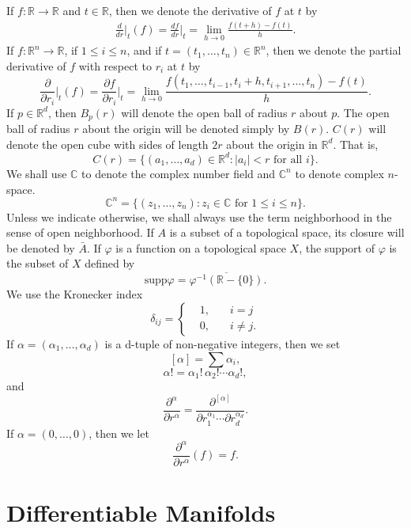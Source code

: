 If $f\colon \mathbb{R} \to \mathbb{R}$ and $t \in \mathbb{R}$, then we denote the derivative of $f$ at $t$ by
\[
	\begin{array}{r}{\frac{d}{d r}\bigg\vert_{t}(f)=\frac{d f}{d r}\bigg\vert_{t}=\lim_{h\to0}\frac{f(t+h)-f(t)}{h}.}\end{array}
\]
If $f: \mathbb{R}^n \to \mathbb{R}$, if $1 \leq i \leq n$, and if $t = (t_1, \ldots, t_n) \in \mathbb{R}^n$, then we denote the partial derivative
of $f$ with respect to $r_i$ at $t$ by 
\[
	\frac{\partial}{\partial r_{i}}\Big\vert_{t}(f)=\frac{\partial f}{\partial r_{i}}\Big\vert_{t}=\lim_{h\to0}\frac{f(t_{1},\ldots,t_{i-1},t_{i}+h,t_{i+1},\ldots,t_{n})-f(t)}{h}.
\]
If $p \in \mathbb{R}^d$, then $B_p(r)$ will denote the open ball of radius $r$ about $p$. The
open ball of radius $r$ about the origin will be denoted simply by $B(r)$. $C(r)$ will
denote the open cube with sides of length $2r$ about the origin in $\mathbb{R}^d$. That is,
\[
	C(r)=\{(a_{1},\ldots,a_{d})\in\mathbb{R}^{d}\colon|a_{i}|<r\text{ for all }i\}.
\]
We shall use $\mathbb{C}$ to denote the complex number field and $\mathbb{C}^{n}$ to denote complex
$n$-space. 
\[
	\mathbb{C}^{n}=\{(z_{1},\ldots,z_{n})\colon z_{i}\in\mathbb{C}\text{ for }1\leq i\leq n\}.
\]
Unless we indicate otherwise, we shall always use the term neighborhood in the sense of open
neighborhood. If $A$ is a subset of a topological space, its closure will be denoted by
$\bar{A}$. If $\varphi$ is a function on a topological space $X$, the support of $\varphi$ is
the subset of $X$ defined by 
\[
	\mathrm{supp}\varphi=\overline{{\varphi^{-1}(\mathbb{R}-\{0\})}}.
\]
We use the Kronecker index 
\[
	\delta_{i j}=\left\{\begin{aligned}{}&{{}1,\quad}&{i=j}\\ {}&{{}0,\quad}&{i\neq j.}\end{aligned}\right.
\]
If  $ \alpha=(\alpha_{1},\ldots,\alpha_{d}) $ is a d-tuple of non-negative integers, then we set
\[
	[\alpha]=\textstyle\sum\alpha_{i},
\]
\[
	\alpha!=\alpha_{1}!\,\alpha_{2}!\cdots\alpha_{d}!,
\]
and
\[
	\frac{\partial^{\alpha}}{\partial r^{\alpha}}=\frac{\partial^{[\alpha]}}{\partial r_{1}^{\alpha_{1}}\cdots\partial r_{d}^{\alpha_{d}}}.
\]
If  $ \alpha = (0, \ldots, 0) $, then we let
\[
	\frac{\partial^{\alpha}}{\partial r^{\alpha}}(f)=f.
\]

\section{Differentiable Manifolds}


